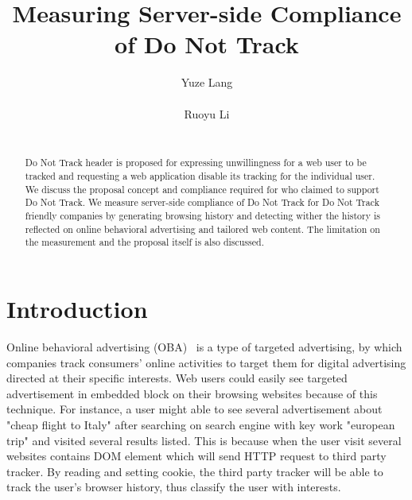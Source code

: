 \documentclass{sig-alternate}
\begin{document}

\title{Measuring Server-side Compliance of Do Not Track}
\author{
\alignauthor
Yuze Lang\\
      \\
\alignauthor
Ruoyu Li\\
      \\
}

\newcommand{\todo}[1]{\textbf{[TODO: #1]}}

\maketitle
\begin{abstract}
Do Not Track header is proposed for expressing unwillingness for a web user to be tracked and requesting a web application disable its tracking for the individual user. We discuss the proposal concept and compliance required for who claimed to support Do Not Track. We  measure server-side compliance of Do Not Track for Do Not Track friendly companies by generating browsing history and detecting wither the history is reflected on online behavioral advertising and tailored web content. The limitation on the measurement and the proposal itself is also discussed.
\end{abstract}



\section{Introduction}\label{sec:intro}
Online behavioral advertising (OBA)~\cite{sheltononline} is a type of targeted advertising, by which companies track consumers’ online activities to target them for digital advertising directed at their specific interests. Web users could easily see targeted advertisement in embedded block on their browsing websites because of this technique. For instance, a user might able to see several advertisement about "cheap flight to Italy" after searching on search engine with key work "european trip" and visited several results listed. This is because when the user visit several websites contains DOM element which will send HTTP request to third party tracker. By reading and setting cookie, the third party tracker will be able to track the user's browser history, thus classify the user with interests.
\end{document}
